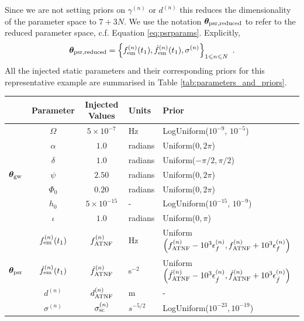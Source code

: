 \documentclass[fleqn,usenatbib,useAMS]{mnras}
\providecommand{\DIFadd}[1]{{\protect\color{blue}\uwave{#1}}} %
\providecommand{\DIFdel}[1]{{\protect\color{red}\sout{#1}}}                      %
\providecommand{\DIFaddFL}[1]{\DIFadd{#1}} %
\providecommand{\DIFdelFL}[1]{\DIFdel{#1}} %
\providecommand{\DIFaddbeginFL}{} %
\providecommand{\DIFaddendFL}{} %
\providecommand{\DIFdelbeginFL}{} %
\providecommand{\DIFdelendFL}{} %
\newcommand{\DIFscaledelfig}{0.5}
\newlength{\DIFdelgraphicswidth} %
\newlength{\DIFdelgraphicsheight} %
\newcommand{\DIFaddincludegraphics}[2][]{{\color{blue}\fbox{\DIFOincludegraphics[#1]{#2}}}} %
\newcommand{\DIFdelincludegraphics}[2][]{%
\sbox{\DIFdelgraphicsbox}{\DIFOincludegraphics[#1]{#2}}%
\settoboxwidth{\DIFdelgraphicswidth}{\DIFdelgraphicsbox} %
\settoboxtotalheight{\DIFdelgraphicsheight}{\DIFdelgraphicsbox} %
\scalebox{\DIFscaledelfig}{%
\parbox[b]{\DIFdelgraphicswidth}{\usebox{\DIFdelgraphicsbox}\\[-\baselineskip] \rule{\DIFdelgraphicswidth}{0em}}\llap{\resizebox{\DIFdelgraphicswidth}{\DIFdelgraphicsheight}{%
\setlength{\unitlength}{\DIFdelgraphicswidth}%
\begin{picture}(1,1)%
\thicklines\linethickness{2pt} %
{\color[rgb]{1,0,0}\put(0,0){\framebox(1,1){}}}%
{\color[rgb]{1,0,0}\put(0,0){\line( 1,1){1}}}%
{\color[rgb]{1,0,0}\put(0,1){\line(1,-1){1}}}%
\end{picture}%
}\hspace*{3pt}}} %
} %
\DeclareRobustCommand{\DIFaddbeginFL}{\DIFOaddbeginFL \let\includegraphics\DIFaddincludegraphics} %
\DeclareRobustCommand{\DIFaddendFL}{\DIFOaddendFL \let\includegraphics\DIFOincludegraphics} %
\DeclareRobustCommand{\DIFdelbeginFL}{\DIFOdelbeginFL \let\includegraphics\DIFdelincludegraphics} %
\DeclareRobustCommand{\DIFdelendFL}{\DIFOaddendFL \let\includegraphics\DIFOincludegraphics} %
\begin{document}
Since we are not setting priors on $\gamma^{(n)}$ or $d^{(n)}$ this reduces the dimensionality of the parameter space to $7 + 3N$. We use the notation $\boldsymbol{\theta}_{\rm psr, reduced}$ to refer to the reduced parameter space, c.f. Equation \ref{eq:psrparams}. Explicitly, 
\begin{equation}
	\boldsymbol{\theta}_{\rm psr, reduced} = \left \{ f_{\rm em}^{(n)}(t_1),\dot{f}_{\rm em}^{(n)}(t_1),\sigma^{(n)}\right\}_{1\leq n \leq N} \ .
\end{equation}
All the injected static parameters and their corresponding priors for this representative example are summarised in Table \ref{tab:parameters_and_priors}.
\begin{table}
	\centering
	\begin{tabular}{lccll}
		\toprule
		&Parameter & Injected Values & Units & Prior  \\
		\hline
		\multirow{7}{2mm}{$\boldsymbol{\theta}_{\rm gw}$} & $\Omega$       & $5 \times 10^{-7}$ & Hz & LogUniform($10^{-9}$, $10^{-5}$) \\
	  & $\alpha$          & $1.0$  & radians & Uniform($0, 2 \pi $)\\
	  & $\delta$              & $1.0$  & radians & Uniform($-\pi/2, \pi/2$) \\
	  & $\psi$              & $2.50$ & radians & Uniform($0, 2 \pi $) \\
	  & $\Phi_0$          & $0.20$ & radians & Uniform($0, 2 \pi $) \\
	  & $h_0$            & $5 \times 10^{-15}$ & - & LogUniform($10^{-15}$, $10^{-9}$) \\
	  & $\iota$             & $1.0$ & radians & Uniform($0, \pi$) \\ 
		\hline
		\multirow{5}{2mm}{$\boldsymbol{\theta}_{\rm psr}$} & $f_{\rm em}^{(n)} (t_1)$       & $f_{\rm ATNF}^{(n)}$ & Hz & Uniform$\left( f_{\rm ATNF}^{(n)} - 10^3 \epsilon^{(n)}_{f}, f_{\rm ATNF}^{(n)} + 10^3 \epsilon^{(n)}_{f} \right)$ \\
		& $\dot{f}_{\rm em}^{(n)} (t_1)$       & $\dot{f}_{\rm ATNF}^{(n)}$ & s$^{-2}$ & Uniform$\left( \dot{f}_{\rm ATNF}^{(n)} - 10^3 \epsilon^{(n)}_{\dot{f}}, \dot{f}_{\rm ATNF}^{(n)} + 10^3 \epsilon^{(n)}_{\dot{f}} \right)$ \\
		&  $d^{(n)}$       &$d_{\rm ATNF}^{(n)}$  & m & - \\
		& $\sigma^{(n)}$              & $\sigma_{\rm sc}^{(n)}$ & \DIFdelbeginFL \DIFdelFL{$s^{-5/2}$ }\DIFdelendFL \DIFaddbeginFL \DIFaddFL{$s^{-3/2}$ }\DIFaddendFL & LogUniform($10^{-23}, 10^{-19}$) \\

\end{tabular}
\end{table}
\end{document}
